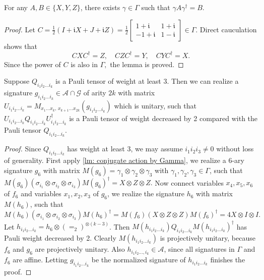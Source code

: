 \begin{lemma}\label{lm: conjugate action by Gamma}
    For any $A,B\in\{X,Y,Z\}$, there exists $\gamma\in \Gamma$ such that $\gamma A\gamma^\dagger =B.$
\end{lemma}
\begin{proof}
    Let $C=\frac{1}{2}(I+\mathfrak iX+J+\mathfrak iZ)=\frac{1}{2}\left[\begin{matrix}
        1+\mathfrak i & 1+\mathfrak i\\
        -1+\mathfrak i & 1-\mathfrak i
    \end{matrix}\right]\in \Gamma.$
    Direct cauculation shows that
    \begin{equation*}
        CXC^\dagger=Z,\quad 
        CZC^\dagger=Y,\quad
        CYC^\dagger=X.
    \end{equation*}
    Since the power of $C$ is also in $\Gamma,$ the lemma is proved.
\end{proof}

\begin{lemma}\label{lm: decrease Pauli weight by 2}
    Suppose $Q_{i_1i_2\ldots i_k}$ is a Pauli tensor of weight at least $3.$
    Then we can realize a signature $g_{i_1i_2\ldots i_k}\in \mathscr{A}\cap \mathcal{G}$ of arity $2k$ with matrix $U_{i_1i_2\ldots i_k}=M_{x_1\ldots x_k,\, x_{k+1}\ldots x_{2k}}(g_{i_1i_2\ldots i_k})$ which is unitary, such that $U_{i_1i_2\ldots i_k}Q_{i_1i_2\ldots i_k}U_{i_1i_2\ldots i_k}^\dagger$ is a Pauli tensor of weight decreased by 2 compared with the Pauli tensor $Q_{i_1i_2\ldots i_k}$.
\end{lemma}

\begin{proof}
    Since $Q_{i_1i_2\ldots i_k}$ has weight at least 3, we may assume $i_1i_2i_3\neq 0$ without loss of generality.
    First apply \cref{lm: conjugate action by Gamma}, we realize a 6-ary signature $g_6$ with matrix $M(g_6)=\gamma_1\otimes \gamma_2\otimes\gamma_3$ with $\gamma_1,\gamma_2,\gamma_3\in \Gamma$, such that $M(g_6)(\sigma_{i_1}\otimes\sigma_{i_2}\otimes \sigma_{i_3})M(g_6)^\dagger=X\otimes Z\otimes Z.$
    Now connect variables $x_4,x_5,x_6$ of $f_6$ and variables $x_1,x_2,x_3$ of $g_6$, we realize the signature $h_6$ with matrix $M(h_6)$, such that $M(h_6)(\sigma_{i_1}\otimes\sigma_{i_2}\otimes \sigma_{i_3})M(h_6)^\dagger=M(f_6)(X\otimes Z\otimes Z)M(f_6)^\dagger=4X\otimes I\otimes I.$
    Let $h_{i_1i_2\ldots i_k}=h_6 \otimes (=_2)^{\otimes (k-3)}$.
    Then $M(h_{i_1i_2\ldots i_k})Q_{i_1i_2\ldots i_k}M(h_{i_1i_2\ldots i_k})^\dagger$ has Pauli weight decreased by 2.
    Clearly $M(h_{i_1i_2\ldots i_k})$ is projectively unitary, because $f_6$ and $g_6$ are projectively unitary.
    Also $h_{i_1i_2\ldots,i_k}\in \mathscr{A}$, since all signatures in $\Gamma$ and $f_6$ are affine.
    Letting $g_{i_1i_2\ldots i_k}$ be the normalized signature of $h_{i_1i_2\ldots i_k}$ finishes the proof.
\end{proof}

